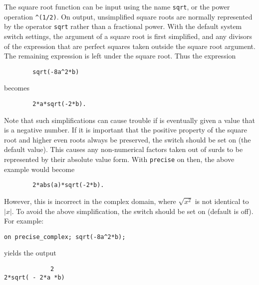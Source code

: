The square root function can be input using the name \texttt{sqrt}, or the
power operation \texttt{\textasciicircum(1/2)}.  On output, unsimplified
square roots
are normally represented by the operator \texttt{sqrt} rather than a
fractional power.  With the default system switch settings, the argument
of a square root is first simplified, and any divisors of the expression
that are perfect squares taken outside the square root argument.  The
remaining expression is left under the square root.
Thus the expression
\begin{verbatim}
        sqrt(-8a^2*b)
\end{verbatim}
becomes
\begin{verbatim}
        2*a*sqrt(-2*b).
\end{verbatim}

\hypertarget{switch:PRECISE}{}
Note that such simplifications can cause trouble if  is eventually
given a value that is a negative number.  If it is important that the
positive property of the square root and higher even roots always be
preserved, the switch  should be set on
(the default value).
This causes any non-numerical factors taken out of surds to be represented
by their absolute value form.
With %
\texttt{precise} on then, the above example would become
\begin{verbatim}
        2*abs(a)*sqrt(-2*b).
\end{verbatim}

\hypertarget{switch:PRECISE_COMPLEX}{}
However, this is incorrect in the complex domain, where
$\sqrt{x^{2}}$ is not identical to $|x|$. To avoid the above
simplification, the switch
 should be set on
(default is off). For example:
\begin{verbatim}
on precise_complex; sqrt(-8a^2*b);
\end{verbatim}
yields the output
\begin{verbatim}
             2
2*sqrt( - 2*a *b)
\end{verbatim}

